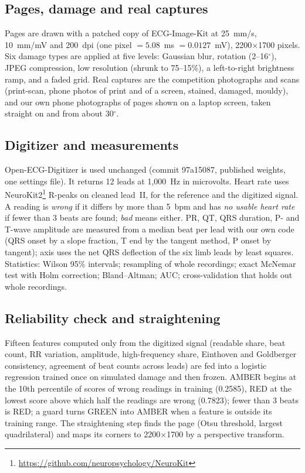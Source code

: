 \documentclass[conference]{IEEEtran}
\begin{document}
\subsection{Pages, damage and real captures}
Pages are drawn with a patched copy of ECG-Image-Kit \cite{ref1} at 25~mm/s, 10~mm/mV and 200~dpi (one pixel $=5.08$~ms $=0.0127$~mV), 2200$\times$1700 pixels. Six damage types are applied at five levels: Gaussian blur, rotation (2--16$^\circ$), JPEG compression, low resolution (shrunk to 75--15\%), a left-to-right brightness ramp, and a faded grid. Real captures are the competition photographs and scans (print-scan, phone photos of print and of a screen, stained, damaged, mouldy), and our own phone photographs of pages shown on a laptop screen, taken straight on and from about 30$^\circ$.

\subsection{Digitizer and measurements}
Open-ECG-Digitizer \cite{ref5} is used unchanged (commit 97a15087, published weights, one settings file). It returns 12 leads at 1{,}000~Hz in microvolts. Heart rate uses NeuroKit2\cite{ref62}\footnote{\url{https://github.com/neuropsychology/NeuroKit}} R-peaks on cleaned lead~II, for the reference and the digitized signal. A reading is \emph{wrong} if it differs by more than 5~bpm and has \emph{no usable heart rate} if fewer than 3 beats are found; \emph{bad} means either. PR, QT, QRS duration, P- and T-wave amplitude are measured from a median beat per lead with our own code (QRS onset by a slope fraction, T end by the tangent method, P onset by tangent); axis uses the net QRS deflection of the six limb leads by least squares. Statistics: Wilson 95\% intervals; resampling of whole recordings; exact McNemar test with Holm correction; Bland--Altman; AUC; cross-validation that holds out whole recordings.

\subsection{Reliability check and straightening}
Fifteen features computed only from the digitized signal (readable share, beat count, RR variation, amplitude, high-frequency share, Einthoven and Goldberger consistency, agreement of beat counts across leads) are fed into a logistic regression trained once on simulated damage and then frozen. AMBER begins at the 10th percentile of scores of wrong readings in training (0.2585), RED at the lowest score above which half the readings are wrong (0.7823); fewer than 3 beats is RED; a guard turns GREEN into AMBER when a feature is outside its training range. The straightening step finds the page (Otsu threshold, largest quadrilateral) and maps its corners to 2200$\times$1700 by a perspective transform.
\end{document}
